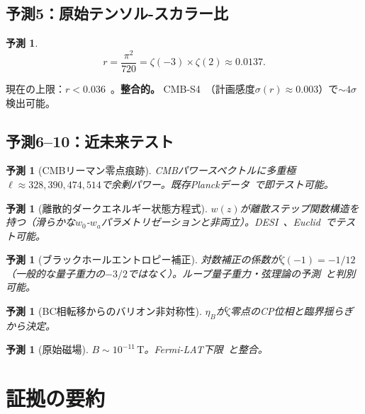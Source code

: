 \documentclass[11pt,a4paper]{article}
\newtheorem{prediction}[theorem]{予測}
\begin{document}
\subsection{予測5：原始テンソル-スカラー比}

\begin{prediction}
\begin{equation}
  r = \frac{\pi^2}{720} = \zeta(-3) \times \zeta(2) \approx 0.0137.
  \label{eq:r}
\end{equation}
\end{prediction}

現在の上限：$r < 0.036$~\cite{BICEP2021}。\textbf{整合的。} CMB-S4~\cite{CMBS4}（計画感度$\sigma(r) \approx 0.003$）で$\sim 4\sigma$検出可能。

\subsection{予測6--10：近未来テスト}

\begin{prediction}[CMBリーマン零点痕跡]
CMBパワースペクトルに多重極$\ell \approx 328, 390, 474, 514$で余剰パワー。既存Planckデータ~\cite{Planck2020}で即テスト可能。
\end{prediction}

\begin{prediction}[離散的ダークエネルギー状態方程式]
$w(z)$が離散ステップ関数構造を持つ（滑らかな$w_0$-$w_a$パラメトリゼーションと非両立）。DESI~\cite{DESI2024}、Euclid~\cite{Euclid2024}でテスト可能。
\end{prediction}

\begin{prediction}[ブラックホールエントロピー補正]
対数補正の係数が$\zeta(-1) = -1/12$（一般的な量子重力の$-3/2$ではなく）。ループ量子重力・弦理論の予測~\cite{Sen2012}と判別可能。
\end{prediction}

\begin{prediction}[BC相転移からのバリオン非対称性]
$\eta_B$が$\zeta$零点のCP位相と臨界揺らぎから決定。
\end{prediction}

\begin{prediction}[原始磁場]
$B \sim 10^{-11}\,\mathrm{T}$。Fermi-LAT下限~\cite{FermiLAT2010}と整合。
\end{prediction}

\section{証拠の要約}
\end{document}
